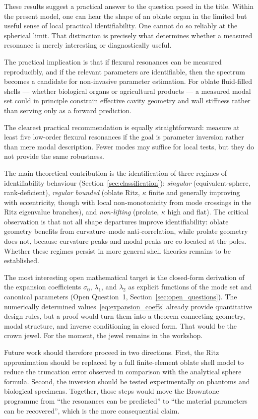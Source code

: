 These results suggest a practical answer to the question posed in the title.
Within the present model, one can hear the shape of an oblate organ in the
limited but useful sense of local practical identifiability.  One cannot do so
reliably at the spherical limit.  That distinction is precisely what determines
whether a measured resonance is merely interesting or diagnostically useful.

The practical implication is that if flexural resonances can
be measured reproducibly, and if the relevant parameters are identifiable, then
the spectrum becomes a candidate for non-invasive parameter estimation.  For
oblate fluid-filled shells --- whether biological organs or agricultural
products --- a measured modal set could in principle constrain effective cavity
geometry and wall stiffness rather than serving only as a forward
prediction.

The clearest practical recommendation is equally straightforward: measure at
least five low-order flexural resonances if the goal is parameter inversion
rather than mere modal description.  Fewer modes may suffice for local tests,
but they do not provide the same robustness.

The main theoretical contribution is the identification of three regimes of
identifiability behaviour (Section~\ref{sec:classification}): \emph{singular}
(equivalent-sphere, rank-deficient), \emph{regular bounded} (oblate Ritz,
$\kappa$ finite and generally improving with eccentricity, though with local
non-monotonicity from mode crossings in the Ritz eigenvalue branches), and
\emph{non-lifting} (prolate, $\kappa$ high and flat).  The critical observation is
that not all shape departures improve identifiability: oblate geometry benefits
from curvature--mode anti-correlation, while prolate geometry does not, because
curvature peaks and modal peaks are co-located at the poles.  Whether these
regimes persist in more general shell theories remains to be established.

The most interesting open mathematical target is the closed-form derivation of
the expansion coefficients $\sigma_0$, $\lambda_1$, and $\lambda_2$ as
explicit functions of the mode set and canonical parameters
(Open Question~1, Section~\ref{sec:open_questions}).  The numerically determined
values~\eqref{eq:expansion_coeffs} already provide quantitative design rules,
but a proof would turn them into a theorem connecting geometry, modal
structure, and inverse conditioning in closed form.  That would be the crown
jewel.  For the moment, the jewel remains in the workshop.

Future work should therefore proceed in two directions.  First, the
Ritz approximation should be replaced by a full finite-element oblate shell
model to reduce the truncation error observed in comparison with the analytical
sphere formula.  Second, the inversion should be tested
experimentally on phantoms and biological specimens.  Together, those steps
would move the Browntone programme from ``the resonances can be predicted'' to
``the material parameters can be recovered'', which is the more consequential
claim.
